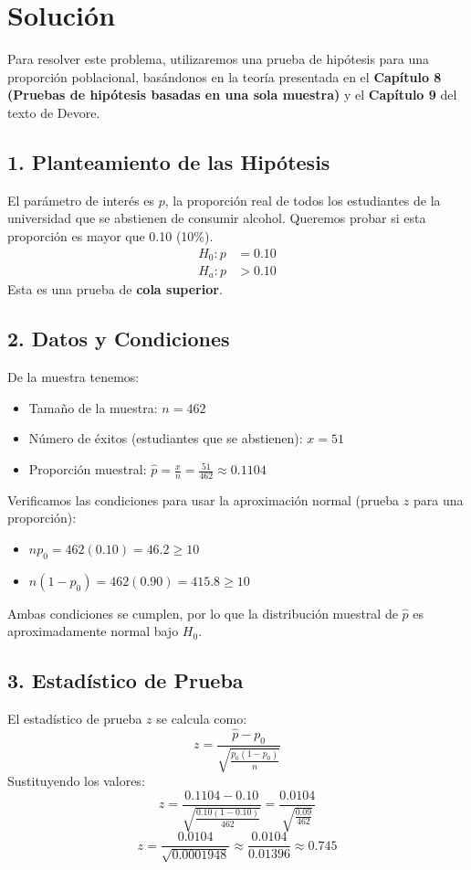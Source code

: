 \documentclass[12pt]{article}
\begin{document}
\section*{Solución}
Para resolver este problema, utilizaremos una prueba de hipótesis para una proporción poblacional, basándonos en la teoría presentada en el \textbf{Capítulo 8 (Pruebas de hipótesis basadas en una sola muestra)} y el \textbf{Capítulo 9} del texto de Devore.

\subsection*{1. Planteamiento de las Hipótesis}
El parámetro de interés es $p$, la proporción real de todos los estudiantes de la universidad que se abstienen de consumir alcohol.
Queremos probar si esta proporción es mayor que 0.10 (10\%).
\begin{align*}
H_0: p &= 0.10 \\
H_a: p &> 0.10
\end{align*}
Esta es una prueba de \textbf{cola superior}.

\subsection*{2. Datos y Condiciones}
De la muestra tenemos:
\begin{itemize}
    \item Tamaño de la muestra: $n = 462$
    \item Número de éxitos (estudiantes que se abstienen): $x = 51$
    \item Proporción muestral: $\hat{p} = \frac{x}{n} = \frac{51}{462} \approx 0.1104$
\end{itemize}

Verificamos las condiciones para usar la aproximación normal (prueba $z$ para una proporción):
\begin{itemize}
    \item $np_0 = 462(0.10) = 46.2 \geq 10$
    \item $n(1-p_0) = 462(0.90) = 415.8 \geq 10$
\end{itemize}
Ambas condiciones se cumplen, por lo que la distribución muestral de $\hat{p}$ es aproximadamente normal bajo $H_0$.

\subsection*{3. Estadístico de Prueba}
El estadístico de prueba $z$ se calcula como:
$$ z = \frac{\hat{p} - p_0}{\sqrt{\frac{p_0(1-p_0)}{n}}} $$
Sustituyendo los valores:
$$ z = \frac{0.1104 - 0.10}{\sqrt{\frac{0.10(1-0.10)}{462}}} = \frac{0.0104}{\sqrt{\frac{0.09}{462}}} $$
$$ z = \frac{0.0104}{\sqrt{0.0001948}} \approx \frac{0.0104}{0.01396} \approx 0.745 $$
\end{document}
